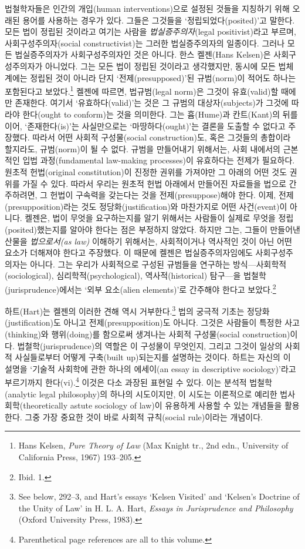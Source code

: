 \documentclass[12pt, oneside]{book}  %
\begin{document}
법철학자들은 인간의 개입(human interventions)으로 설정된 것들을 지칭하기
위해 오래된 용어를 사용하는 경우가 있다. 그들은 그것들을
`정립되었다(posited)'고 말한다. 모든 법이 정립된 것이라고 여기는 사람을
\emph{법실증주의자}(legal positivist)라고 부르며, 사회구성주의자(social
constructivist)는 그러한 법실증주의자의 일종이다. 그러나 모든
법실증주의자가 사회구성주의자인 것은 아니다. 한스 켈젠(Hans Kelsen)은
사회구성주의자가 아니었다. 그는 모든 법이 정립된 것이라고 생각했지만,
동시에 모든 법체계에는 정립된 것이 아니라 단지 `전제(presupposed)'된
규범(norm)이 적어도 하나는 포함된다고 보았다.\footnote{Hans Kelsen,
  \emph{Pure Theory of Law} (Max Knight tr., 2nd edn., University of
  California Press, 1967) 193--205.} 켈젠에 따르면, 법규범(legal norm)은
그것이 유효(valid)할 때에만 존재한다. 여기서 `유효하다(valid)'는 것은 그
규범의 대상자(subjects)가 그것에 따라야 한다(ought to conform)는 것을
의미한다. 그는 흄(Hume)과 칸트(Kant)의 뒤를 이어, `존재한다(is)'는
사실만으로는 `마땅하다(ought)'는 결론을 도출할 수 없다고 주장했다.
따라서 어떤 사회적 구성물(social construction)도, 혹은 그것들의 총합이라
할지라도, 규범(norm)이 될 수 없다. 규범을 만들어내기 위해서는, 사회
내에서의 근본적인 입법 과정(fundamental law-making processes)이
유효하다는 전제가 필요하다. 원초적 헌법(original constitution)이 진정한
권위를 가져야만 그 아래의 어떤 것도 권위를 가질 수 있다. 따라서 우리는
원초적 헌법 아래에서 만들어진 자료들을 법으로 간주하려면, 그 헌법이
구속력을 갖는다는 것을 전제(presuppose)해야 한다. 이제,
전제(presupposition)라는 것도 정당화(justification)와 마찬가지로 어떤
사건(event)이 아니다. 켈젠은, 법이 무엇을 요구하는지를 알기 위해서는
사람들이 실제로 무엇을 정립(posited)했는지를 알아야 한다는 점은 부정하지
않았다. 하지만 그는, 그들이 만들어낸 산물을 \emph{법으로서(as law)}
이해하기 위해서는, 사회적이거나 역사적인 것이 아닌 어떤 요소가 더해져야
한다고 주장했다. 이 때문에 켈젠은 법실증주의자임에도 사회구성주의자는
아니다. 그는 우리가 사회적으로 구성된 규범들을 연구하는
방식---사회학적(sociological), 심리학적(psychological),
역사적(historical) 탐구---을 법철학(jurisprudence)에서는 `외부
요소(alien elements)'로 간주해야 한다고 보았다.\footnote{Ibid. 1.}

하트(Hart)는 켈젠의 이러한 견해 역시 거부한다.\footnote{See below,
  292--3, and Hart's essays `Kelsen Visited' and `Kelsen's Doctrine of
  the Unity of Law' in H. L. A. Hart, \emph{Essays in Jurisprudence and
  Philosophy} (Oxford University Press, 1983).} 법의 궁극적 기초는
정당화(justification)도 아니고 전제(presupposition)도 아니다. 그것은
사람들이 특정한 사고(thinking)와 행위(doing)를 함으로써 생겨나는 사회적
구성물(social construction)이다. 법철학(jurisprudence)의 역할은 이
구성물이 무엇인지, 그리고 그것이 일상의 사회적 사실들로부터 어떻게
구축(built up)되는지를 설명하는 것이다. 하트는 자신의 이 설명을 `기술적
사회학에 관한 하나의 에세이(an essay in descriptive sociology)'라고
부르기까지 한다(vi).\footnote{Parenthetical page references are all to
  this volume.} 이것은 다소 과장된 표현일 수 있다. 이는 분석적
법철학(analytic legal philosophy)의 하나의 시도이지만, 이 시도는
이론적으로 예리한 법사회학(theoretically astute sociology of law)이
유용하게 사용할 수 있는 개념들을 활용한다. 그중 가장 중요한 것이 바로
사회적 규칙(social rule)이라는 개념이다.
\end{document}
